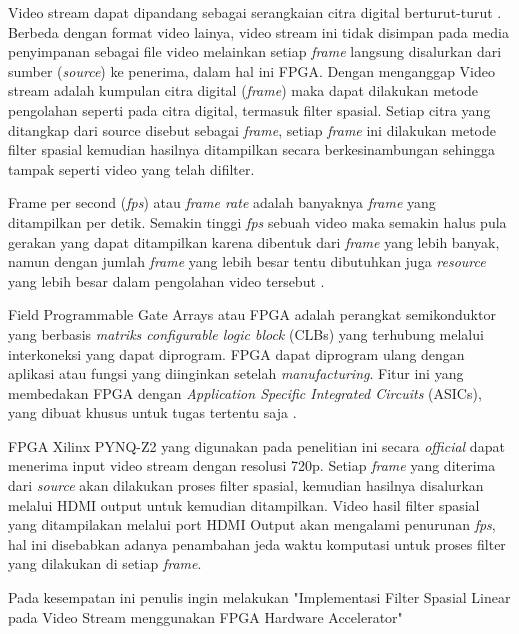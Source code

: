 Video stream dapat dipandang sebagai serangkaian citra digital berturut-turut . Berbeda dengan format video lainya, video stream ini tidak disimpan pada media penyimpanan sebagai file video melainkan setiap \textit{frame} langsung disalurkan dari sumber (\textit{source}) ke penerima, dalam hal ini FPGA. Dengan menganggap Video stream adalah kumpulan citra digital (\textit{frame}) maka dapat dilakukan metode pengolahan seperti pada citra digital, termasuk filter spasial. Setiap citra yang ditangkap dari source disebut sebagai \textit{frame}, setiap \textit{frame} ini dilakukan metode filter spasial kemudian hasilnya ditampilkan secara berkesinambungan sehingga tampak seperti video yang telah difilter.

Frame per second (\textit{fps}) atau \textit{frame rate} adalah banyaknya \textit{frame} yang ditampilkan per detik. Semakin tinggi \textit{fps} sebuah video maka semakin halus pula gerakan yang dapat ditampilkan karena dibentuk dari \textit{frame} yang lebih banyak, namun dengan jumlah \textit{frame} yang lebih besar tentu dibutuhkan juga \textit{resource} yang lebih besar dalam pengolahan video tersebut . 


Field Programmable Gate Arrays atau FPGA adalah perangkat semikonduktor yang berbasis \textit{matriks configurable logic block} (CLBs) yang terhubung melalui interkoneksi yang dapat diprogram. FPGA dapat diprogram ulang dengan aplikasi atau fungsi yang diinginkan setelah \textit{manufacturing}. Fitur ini yang membedakan FPGA dengan \textit{Application Specific Integrated Circuits} (ASICs), yang dibuat khusus untuk tugas tertentu saja .

FPGA Xilinx PYNQ-Z2 yang digunakan pada penelitian ini secara \textit{official} dapat menerima input video stream dengan resolusi 720p. Setiap \textit{frame} yang diterima dari \textit{source} akan dilakukan proses filter spasial, kemudian hasilnya disalurkan melalui HDMI output untuk kemudian ditampilkan. Video hasil filter spasial yang ditampilakan melalui port HDMI Output akan mengalami penurunan \textit{fps}, hal ini disebabkan adanya penambahan jeda waktu komputasi untuk proses filter yang dilakukan di setiap \textit{frame}. 

Pada kesempatan ini penulis ingin melakukan "Implementasi Filter Spasial Linear pada Video Stream menggunakan FPGA Hardware Accelerator"


